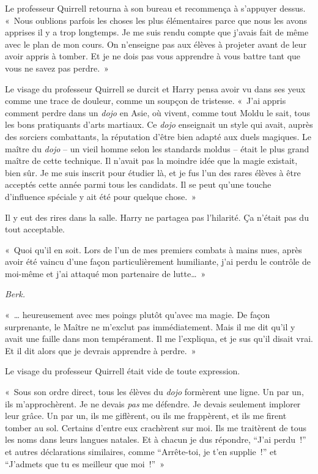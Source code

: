 Le professeur Quirrell retourna à son bureau et recommença à s'appuyer dessus.
«~Nous oublions parfois les choses les plus élémentaires parce que nous les avons apprises il y a trop longtemps.
Je me suis rendu compte que j'avais fait de même avec le plan de mon cours.
On n'enseigne pas aux élèves à projeter avant de leur avoir appris à tomber.
Et je ne dois pas vous apprendre à vous battre tant que vous ne savez pas perdre.~»

Le visage du professeur Quirrell se durcit et Harry pensa avoir vu dans ses yeux comme une trace de douleur, comme un soupçon de tristesse.
«~J'ai appris comment perdre dans un \emph{dojo} en Asie, où vivent, comme tout Moldu le sait, tous les bons pratiquants d'arts martiaux.
Ce \emph{dojo} enseignait un style qui avait, auprès des sorciers combattants, la réputation d'être bien adapté aux duels magiques.
Le maître du \emph{dojo} -- un vieil homme selon les standards moldus -- était le plus grand maître de cette technique.
Il n'avait pas la moindre idée que la magie existait, bien sûr.
Je me suis inscrit pour étudier là, et je fus l'un des rares élèves à être acceptés cette année parmi tous les candidats.
Il se peut qu'une touche d'influence spéciale y ait été pour quelque chose.~»

Il y eut des rires dans la salle.
Harry ne partagea pas l'hilarité.
Ça n'était pas du tout acceptable.

«~Quoi qu'il en soit.
Lors de l'un de mes premiers combats à mains nues, après avoir été vaincu d'une façon particulièrement humiliante, j'ai perdu le contrôle de moi-même et j'ai attaqué mon partenaire de lutte…~»

\emph{Berk.}

«~… heureusement avec mes poings plutôt qu'avec ma magie.
De façon surprenante, le Maître ne m'exclut pas immédiatement.
Mais il me dit qu'il y avait une faille dans mon tempérament.
Il me l'expliqua, et je sus qu'il disait vrai.
Et il dit alors que je devrais apprendre à perdre.~»

Le visage du professeur Quirrell était vide de toute expression.

«~Sous son ordre direct, tous les élèves du \emph{dojo} formèrent une ligne.
Un par un, ils m'approchèrent.
Je ne devais \emph{pas} me défendre.
Je devais seulement implorer leur grâce.
Un par un, ils me giflèrent, ou ils me frappèrent, et ils me firent tomber au sol.
Certains d'entre eux crachèrent sur moi.
Ils me traitèrent de tous les noms dans leurs langues natales.
Et à chacun je dus répondre, “J'ai perdu~!” et autres déclarations similaires, comme “Arrête-toi, je t'en supplie~!” et “J'admets que tu es meilleur que moi~!”~»

